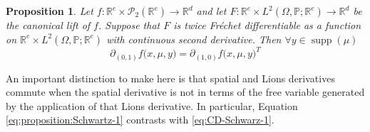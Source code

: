 \documentclass[a4paper,11pt,twoside]{article}
\numberwithin{equation}{section}
\theoremstyle{plain}
\newtheorem{proposition}[theorem]{Proposition}
\newcommand{\bP}{\mathbb{P}}
\newcommand{\bR}{\mathbb{R}}
\newcommand{\cP}{\mathcal{P}}
\DeclareMathOperator{\supp}{supp}
\newcommand{\1}{\mathbbm{1}}
\begin{document}
	\begin{proposition}
		\label{proposition:Schwartz-1}
		Let $f: \bR^e \times \cP_2(\bR^e) \to \bR^d$ and let $F: \bR^e \times L^2(\Omega, \bP; \bR^e) \to \bR^d$ be the canonical lift of $f$. Suppose that $F$ is twice Fr\'echet differentiable as a function on $\bR^e \times L^2(\Omega, \bP; \bR^e)$ with continuous second derivative. Then $\forall y \in \supp(\mu)$
		\begin{equation}
			\label{eq:proposition:Schwartz-1}
			\partial_{(0,1)} f\Big( x, \mu, y \Big) = \partial_{(1,0)} f \Big(x, \mu, y \Big)^T 
		\end{equation}
	\end{proposition}
	
	An important distinction to make here is that spatial and Lions derivatives commute when the spatial derivative is not in terms of the free variable generated by the application of that Lions derivative. In particular, Equation \eqref{eq:proposition:Schwartz-1} contrasts with \eqref{eq:CD-Schwarz-1}. 
\end{document}
